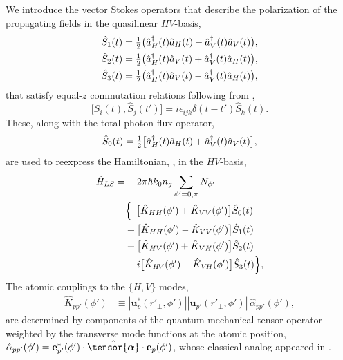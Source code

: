 \documentclass[aps,pra,twocolumn]{revtex4-1} %
\newcommand{\poltens}{\hat{\tensor{\boldsymbol{\alpha}}}}
\newcommand{\polcomp}{\hat{K}} %
\begin{document}
We introduce the vector Stokes operators that describe the polarization of the propagating fields in the quasilinear $HV$-basis,
\begin{subequations}\label{Eq::StokesComponents}
	\begin{align}
		\hat{S}_1(t) &= \mbox{$\frac{1}{2}$}\big( \hat{a}^\dag_H(t) \hat{a}_H(t)-\hat{a}^\dag_V(t) \hat{a}_V(t) \big), \\
		\hat{S}_2(t) &= \mbox{$\frac{1}{2}$}\big( \hat{a}^\dag_H(t) \hat{a}_V(t)+\hat{a}^\dag_V(t) \hat{a}_H(t) \big), \\
		\hat{S}_3(t) &= \mbox{$\frac{1}{2}$}\big( \hat{a}^\dag_H(t) \hat{a}_V(t) -\hat{a}^\dag_V(t) \hat{a}_H(t) \big),
	\end{align}
\end{subequations}
that satisfy equal-$z$ commutation relations following from ,
	\begin{equation} \label{Eq::StokesCommutation}
		\big[\hat{S}_i(t), \hat{S}_j(t')\big] =i \epsilon_{ijk} \delta(t-t')  \hat{S}_k(t).
	\end{equation}
These, along with the total photon flux operator,
	\begin{equation}
		\hat{S}_0(t) = \mbox{$\frac{1}{2}$}\big[ \hat{a}^\dag_H(t) \hat{a}_H(t)+\hat{a}^\dag_V(t) \hat{a}_V(t) \big],
	\end{equation}
are used to reexpress the Hamiltonian, , in the $HV$-basis,
	\begin{align}  
		\hat{H}_{LS} 	=& - 2 \pi \hbar k_0 n_g \sum_{\phi'=0,\pi}N_{\phi'} \nn\\
		&\Big\{\,\,\, \big[ \polcomp_{HH}(\phi')+\polcomp_{VV}(\phi') \big] \hat{S}_0(t) \nn\\
		&+  \big[\polcomp_{HH}(\phi')  - \polcomp_{VV}(\phi')  \big] \hat{S}_1(t) \nonumber \\
&+ \big[\polcomp_{HV}(\phi') + \polcomp_{VH}(\phi')  \big] \hat{S}_2(t) \nn\\
&+ i  \big[ \polcomp_{H\!V}(\phi')-\polcomp_{V\!H}(\phi') \big]\hat{S}_3(t) \Big\}, \label{Eq::GenHamiltonian} 
	\end{align}
The atomic couplings to the $\{H,V\}$ modes,
	\begin{align} 
		\polcomp_{p p'}(\phi') & \equiv |\mathbf{u}^*_p(r'_\perp, \phi')||\mathbf{u}_{p'}(r'_\perp, \phi')| \, \hat{\alpha}_{p p'}(\phi') , 
	\end{align}
are determined by components of the quantum mechanical tensor operator weighted by the transverse mode functions at the atomic position, $\hat{\alpha}_{p p'}(\phi') = \mathbf{e}^*_{p'}(\phi') \cdot \poltens \cdot \mathbf{e}_{p}(\phi') $, whose classical analog appeared in .
\end{document}
